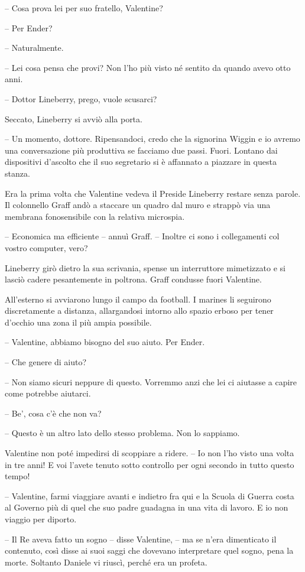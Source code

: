 {-- Cosa prova lei per suo fratello, Valentine?}

{-- Per Ender?}

{-- Naturalmente.}

{-- Lei cosa pensa che provi? Non l'ho più visto né sentito da quando
	avevo otto anni.}

{-- Dottor Lineberry, prego, vuole scusarci?}

{Seccato, Lineberry si avviò alla porta.}

{-- Un momento, dottore. Ripensandoci, credo che la signorina Wiggin e
	io avremo una conversazione più produttiva se facciamo due passi. Fuori.
	Lontano dai dispositivi d'ascolto che il suo segretario si è affannato a
	piazzare in questa stanza.}

{Era la prima volta che Valentine vedeva il Preside Lineberry restare
	senza parole. Il colonnello Graff andò a staccare un quadro dal muro e
	strappò via una membrana fonosensibile con la relativa microspia.}

{-- Economica ma efficiente -- annuì Graff. -- Inoltre ci sono i
	collegamenti col vostro computer, vero?}

{Lineberry girò dietro la sua scrivania, spense un interruttore
	mimetizzato e si lasciò cadere pesantemente in poltrona. Graff condusse
	fuori Valentine.}

{All'esterno si avviarono lungo il campo da football. I marines li
	seguirono discretamente a distanza, allargandosi intorno allo spazio
	erboso per tener d'occhio una zona il più ampia possibile.}

{-- Valentine, abbiamo bisogno del suo aiuto. Per Ender.}

{-- Che genere di aiuto?}

{-- Non siamo sicuri neppure di questo. Vorremmo anzi che lei ci
	aiutasse a capire come potrebbe aiutarci.}

{-- Be', cosa c'è che non va?}

{-- Questo è un altro lato dello stesso problema. Non lo sappiamo.}

{Valentine non poté impedirsi di scoppiare a ridere. -- Io non l'ho
	visto una volta in tre anni! E voi l'avete tenuto sotto controllo per
	ogni secondo in tutto questo tempo!}

{-- Valentine, farmi viaggiare avanti e indietro fra qui e la Scuola di
	Guerra costa al Governo più di quel che suo padre guadagna in una vita
	di lavoro. E io non viaggio per diporto.}

{-- Il Re aveva fatto un sogno -- disse Valentine, -- ma se n'era
	dimenticato il contenuto, così disse ai suoi saggi che dovevano
	interpretare quel sogno, pena la morte. Soltanto Daniele vi riuscì,
	perché era un profeta.}

